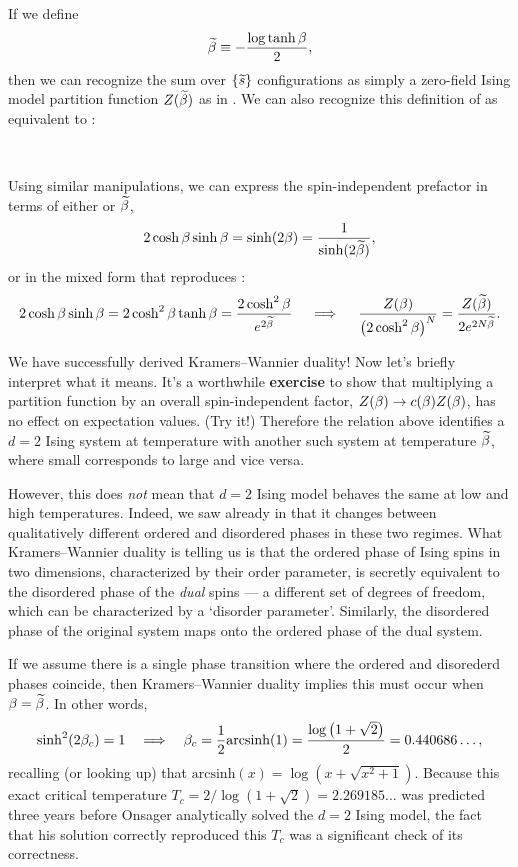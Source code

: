 If we define
\begin{equation*}
  \widetilde{\beta} \equiv -\frac{\log \tanh \beta}{2},
\end{equation*}
then we can recognize the sum over $\left\{\widetilde s\right\}$ configurations as simply a zero-field Ising model partition function $Z(\widetilde{\beta})$ as in .
We can also recognize this definition of \betw as equivalent to :
\begin{mdframed}
  \ \\[100 pt]
\end{mdframed}
Using similar manipulations, we can express the spin-independent prefactor in terms of either \be or $\widetilde{\beta}$,
\begin{equation*}
  2\cosh\beta \sinh\beta = \sinh(2\beta) = \frac{1}{\sinh(2\widetilde{\beta})},
\end{equation*}
or in the mixed form that reproduces :
\begin{equation*}
  2\cosh\beta \sinh\beta = 2\cosh^2 \beta \tanh\beta = \frac{2\cosh^2 \beta}{e^{2\widetilde{\beta}}} \quad \implies \quad \frac{Z(\beta)}{\left(2\cosh^2\beta\right)^N} = \frac{Z(\widetilde{\beta})}{2e^{2N\widetilde{\beta}}}.
\end{equation*}

We have successfully derived Kramers--Wannier duality!
Now let's briefly interpret what it means.
It's a worthwhile \textbf{exercise} to show that multiplying a partition function by an overall spin-independent factor, $Z(\beta) \to c(\beta) Z(\beta)$, has no effect on expectation values.
(Try it!)
Therefore the relation above identifies a $d = 2$ Ising system at temperature \be with another such system at temperature $\widetilde{\beta}$, where small \be corresponds to large \betw and vice versa.

However, this does \textit{not} mean that $d = 2$ Ising model behaves the same at low and high temperatures.
Indeed, we saw already in  that it changes between qualitatively different ordered and disordered phases in these two regimes.
What Kramers--Wannier duality is telling us is that the ordered phase of Ising spins in two dimensions, characterized by their order parameter, is secretly equivalent to the disordered phase of the \textit{dual} spins --- a different set of degrees of freedom, which can be characterized by a `disorder parameter'.
Similarly, the disordered phase of the original system maps onto the ordered phase of the dual system.

If we assume there is a single phase transition where the ordered and disorederd phases coincide, then Kramers--Wannier duality implies this must occur when $\beta = \widetilde{\beta}$.
In other words,
\begin{equation*}
  \sinh^2(2\beta_c) = 1 \quad \Longrightarrow \quad \beta_c = \frac{1}{2} \mathrm{arcsinh}(1) = \frac{\log\left(1 + \sqrt{2}\right)}{2} = 0.440686\dots,
\end{equation*}
recalling (or looking up) that $\mathrm{arcsinh}(x) = \log\left(x + \sqrt{x^2 + 1}\right)$.
Because this exact critical temperature $T_c = 2 / \log\left(1 + \sqrt{2}\right) = 2.269185\dots$ was predicted three years before Onsager analytically solved the $d = 2$ Ising model, the fact that his solution correctly reproduced this $T_c$ was a significant check of its correctness.

